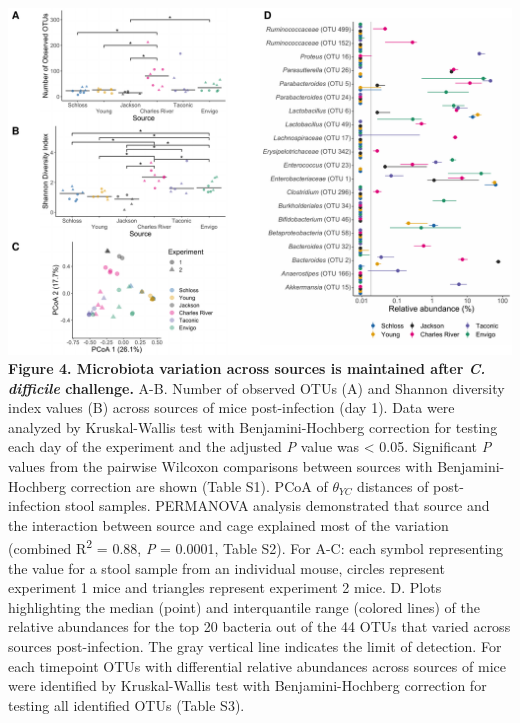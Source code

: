 \documentclass[11pt,]{article}
\begin{document}
\newpage

\includegraphics{figure_4.pdf} \textbf{Figure 4. Microbiota variation
across sources is maintained after \emph{C. difficile} challenge.} A-B.
Number of observed OTUs (A) and Shannon diversity index values (B)
across sources of mice post-infection (day 1). Data were analyzed by
Kruskal-Wallis test with Benjamini-Hochberg correction for testing each
day of the experiment and the adjusted \emph{P} value was \textless{}
0.05. Significant \emph{P} values from the pairwise Wilcoxon comparisons
between sources with Benjamini-Hochberg correction are shown (Table S1).
PCoA of \(\theta_{YC}\) distances of post-infection stool samples.
PERMANOVA analysis demonstrated that source and the interaction between
source and cage explained most of the variation (combined
R\textsuperscript{2} = 0.88, \emph{P} = 0.0001, Table S2). For A-C: each
symbol representing the value for a stool sample from an individual
mouse, circles represent experiment 1 mice and triangles represent
experiment 2 mice. D. Plots highlighting the median (point) and
interquantile range (colored lines) of the relative abundances for the
top 20 bacteria out of the 44 OTUs that varied across sources
post-infection. The gray vertical line indicates the limit of detection.
For each timepoint OTUs with differential relative abundances across
sources of mice were identified by Kruskal-Wallis test with
Benjamini-Hochberg correction for testing all identified OTUs (Table
S3).

\newpage
\end{document}
